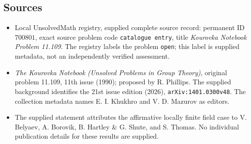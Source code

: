 \documentclass[11pt]{article}
\begin{document}
\subsection{Sources}
\begin{itemize}
\item Local UnsolvedMath registry, supplied complete source record: permanent ID \(700801\), exact source problem code \texttt{catalogue entry}, title \emph{Kourovka Notebook Problem 11.109}. The registry labels the problem \texttt{open}; this label is supplied metadata, not an independently verified assessment.
\item \emph{The Kourovka Notebook (Unsolved Problems in Group Theory)}, original problem 11.109, 11th issue (1990); proposed by R. Phillips. The supplied background identifies the 21st issue edition (2026), \texttt{arXiv:1401.0300v48}. The collection metadata names E. I. Khukhro and V. D. Mazurov as editors.
\item The supplied statement attributes the affirmative locally finite field case to V. Belyaev, A. Borovik, B. Hartley \& G. Shute, and S. Thomas. No individual publication details for these results are supplied.
\end{itemize}
\end{document}
